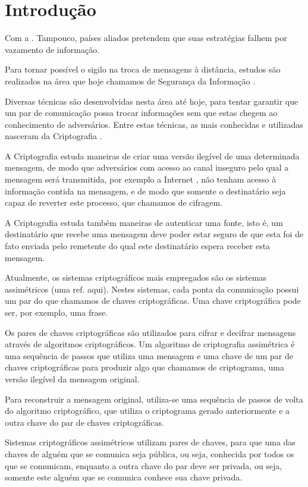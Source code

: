 \chapter{Introdução}

Com a . Tampouco, países aliados
pretendem que suas estratégias falhem por vazamento de informação.

Para tornar possível o sigilo na troca de mensagens à distância, estudos são
realizados na área que hoje chamamos de Segurança da Informação
\cite{information_security}.

Diversas técnicas são desenvolvidas nesta área até hoje, para tentar garantir
que um par de comunicação possa trocar informações sem que estas chegem ao
conhecimento de adversários. Entre estas técnicas, as mais conhecidas e
utilizadas nasceram da Criptografia \cite{cryptography}.

A Criptografia estuda maneiras de criar uma versão ilegível de uma determinada
mensagem, de modo que adversários com acesso ao canal inseguro pelo qual a
mensagem será transmitida, por exemplo a Internet \cite{internet}, não tenham
acesso à informação contida na mensagem, e de modo que somente o destinatário
seja capaz de reverter este processo, que chamamos de cifragem.

A Criptografia estuda também maneiras de autenticar uma fonte, isto é, um
destinatário que recebe uma mensagem deve poder estar seguro de que esta foi de
fato enviada pelo remetente do qual este destinatário espera receber esta
mensagem.

Atualmente, os sistemas criptográficos mais empregados são os sistemas
assimétricos (uma ref. aqui). Nestes sistemas, cada ponta da comunicação possui
um par do que chamamos de chaves criptográficas. Uma chave criptográfica pode
ser, por exemplo, uma frase.

Os pares de chaves criptográficas são utilizados para cifrar e decifrar
mensagens através de algoritmos criptográficos. Um algoritmo de criptografia
assimétrica é uma sequência de passos que utiliza uma mensagem e uma chave de um
par de chaves criptográficas para produzir algo que chamamos de criptograma, uma
versão ilegível da mensagem original.

Para reconstruir a mensagem original, utiliza-se uma sequência de passos de
volta do algoritmo criptográfico, que utiliza o criptograma gerado anteriormente
e a outra chave do par de chaves criptográficas.

Sistemas criptográficos assimétricos utilizam pares de chaves, para que uma das
chaves de alguém que se comunica seja pública, ou seja, conhecida por todos os
que se comunicam, enquanto a outra chave do par deve ser privada, ou seja,
somente este alguém que se comunica conhece sua chave privada.

